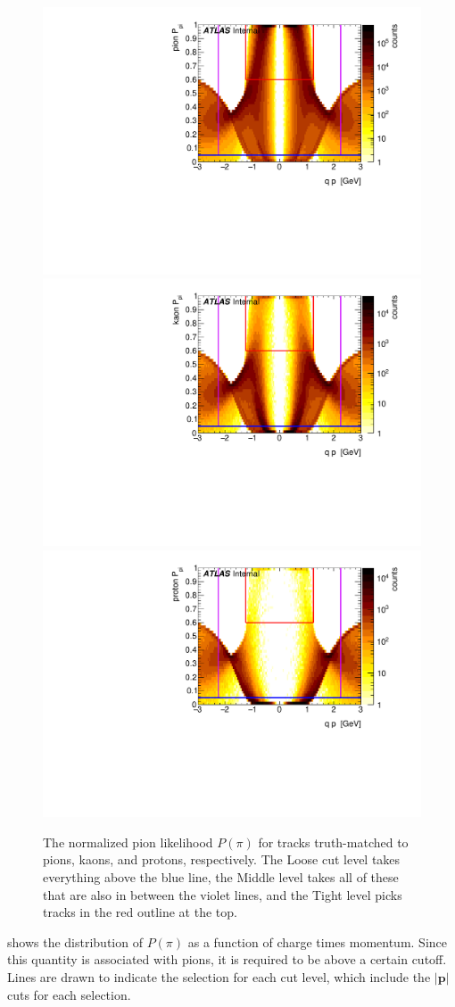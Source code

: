 \begin{figure}[t]
\begin{minipage}[t]{1.0\textwidth}
\centering
\includegraphics[width=.32\linewidth]{P_pion_pi.pdf}
\includegraphics[width=.32\linewidth]{P_kaon_pi.pdf}
\includegraphics[width=.32\linewidth]{P_proton_pi.pdf}
\end{minipage}
\caption{The normalized pion likelihood $P(\pi)$ for tracks truth-matched to pions, kaons, and protons, respectively. The Loose cut level takes everything above the blue line, the Middle level takes all of these that are also in between the violet lines, and the Tight level picks tracks in the red outline at the top.}
\label{fig:prob_pi}
\end{figure}

 shows the distribution of $P(\pi)$ as a function of charge times momentum.
Since this quantity is associated with pions, it is required to be above a certain cutoff.
Lines are drawn to indicate the selection for each cut level, which include the $\left|\mathbf{p}\right|$ cuts for each selection.


